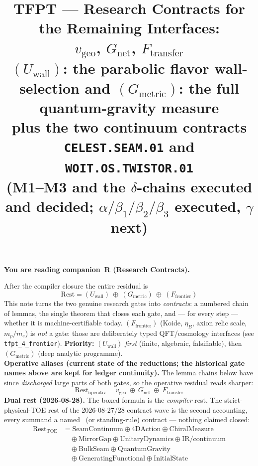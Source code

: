 \documentclass[11pt,a4paper]{article}
\title{\vspace{-1.2cm}\textbf{TFPT --- Research Contracts for the Remaining Interfaces:\\$v_{\mathrm{geo}}$, $G_{\mathrm{net}}$, $F_{\mathrm{transfer}}$}\\[2mm]
\large $(U_{\mathrm{wall}})$: the parabolic flavor wall-selection \quad and\quad
$(G_{\mathrm{metric}})$: the full quantum-gravity measure\\[1mm]
\large plus the two continuum contracts \texttt{CELEST.SEAM.01} and \texttt{WOIT.OS.TWISTOR.01}\\
(M1--M3 and the $\delta$-chains executed and decided; $\alpha/\beta_1/\beta_2/\beta_3$ executed, $\gamma$ next)}
\author{\TFPTauthors}\date{\TFPTdatestamp}
\begin{document}
\maketitle


\noindent\textbf{You are reading \textbf{companion~R} (Research Contracts).}


\TFPTbadges
\TFPTclaimstack[bridges]

\vspace{-0.6cm}

\begin{keybox}
After the compiler closure the entire residual is
\[
  \boxed{\ \text{Rest}=(U_{\mathrm{wall}})\ \oplus\ (G_{\mathrm{metric}})\ \oplus\ (F_{\mathrm{frontier}})\ }
\]
This note turns the two genuine research gates into \emph{contracts}: a numbered chain of lemmas, the
single theorem that closes each gate, and --- for every step --- whether it is machine-certifiable today.
$(F_{\mathrm{frontier}})$ (Koide, $\eta_B$, axion relic scale, $m_p/m_e$) is \emph{not} a gate: those are
deliberately typed QFT/cosmology interfaces (see \texttt{tfpt\_4\_frontier}). \textbf{Priority:}
$(U_{\mathrm{wall}})$ \emph{first} (finite, algebraic, falsifiable), then $(G_{\mathrm{metric}})$ (deep
analytic programme).
\smallskip\\
\noindent\textbf{Operative aliases (current state of the reductions; the historical gate names above are
kept for ledger continuity).} The lemma chains below have since \emph{discharged} large parts of both
gates, so the operative residual reads sharper:
\[
  \boxed{\ \text{Rest}_{\mathrm{operativ}}=v_{\mathrm{geo}}\ \oplus\ G_{\mathrm{net}}\ \oplus\ F_{\mathrm{transfer}}\ }
\]
\noindent\textbf{Dual rest (2026-08-28).}  The boxed formula is the \emph{compiler} rest.  The
strict-physical-TOE rest of the 2026-08-27/28 contract wave is the second accounting, every summand a
named \mO\ (or standing-rule) contract --- nothing claimed closed:
\[
  \boxed{\begin{aligned}
  \text{Rest}_{\mathrm{TOE}}
    &=\mathrm{SeamContinuum}\oplus\mathrm{4DAction}\oplus\mathrm{ChiralMeasure}\\
    &\quad\oplus\mathrm{MirrorGap}\oplus\mathrm{UnitaryDynamics}\oplus\mathrm{IR/continuum}\\
    &\quad\oplus\mathrm{BulkSeam}\oplus\mathrm{QuantumGravity}\\
    &\quad\oplus\mathrm{GeneratingFunctional}\oplus\mathrm{InitialState}
  \end{aligned}}
\]
\end{keybox}
\end{document}
